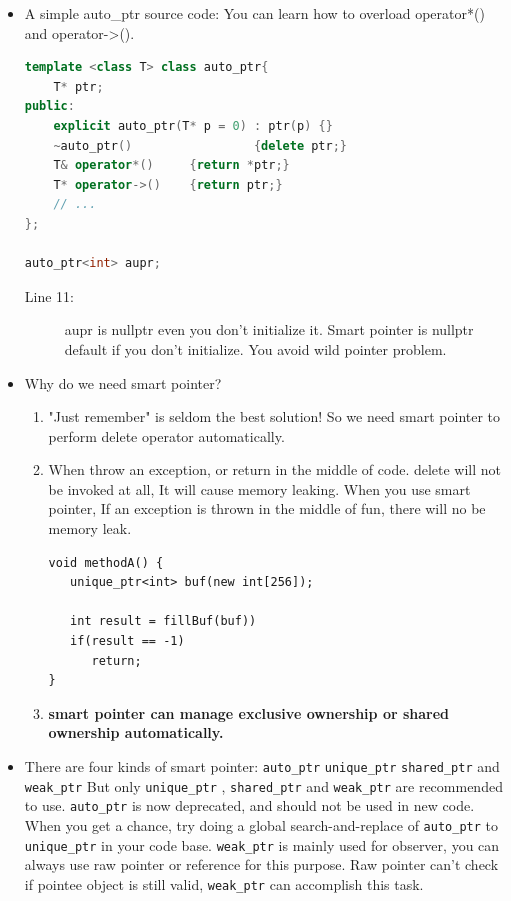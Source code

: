 \documentclass[a4paper,11pt,twoside]{book}
\begin{document}
\begin{itemize}
\item A simple auto\_ptr source code: You can learn how to overload operator*() and operator->().
\begin{lstlisting}[frame=single, language=c++, mathescape=true]
template <class T> class auto_ptr{
    T* ptr;
public:
    explicit auto_ptr(T* p = 0) : ptr(p) {}
    ~auto_ptr()                 {delete ptr;}
    T& operator*()     {return *ptr;}
    T* operator->()    {return ptr;}
    // ...
};

auto_ptr<int> aupr;

\end{lstlisting}
\begin{description}
	\item[Line 11:] aupr is nullptr even you don't initialize it. Smart pointer is nullptr default if you don't initialize. You avoid wild pointer problem.
\end{description}

\item Why do we need smart pointer?
\begin{enumerate}
\item "Just remember" is seldom the best solution! So we need smart pointer to perform delete operator automatically.

\item When throw an exception, or return in the middle of code. delete will not be invoked at all, It will cause memory leaking. When you use smart pointer, If an exception is thrown in the middle of fun, there will no be memory leak.
\begin{lstlisting}[numbers=none]
void methodA() {
   unique_ptr<int> buf(new int[256]);

   int result = fillBuf(buf))
   if(result == -1)
      return;
}
\end{lstlisting}

\item \textbf{smart pointer can manage exclusive ownership or shared ownership automatically. }
\end{enumerate}

\item There are four kinds of smart pointer: \texttt{auto\_ptr} \texttt{unique\_ptr} \texttt{shared\_ptr} and \texttt{weak\_ptr}  But only \texttt{unique\_ptr} , \texttt{shared\_ptr} and \texttt{weak\_ptr} are recommended to use. \texttt{auto\_ptr} is now deprecated, and should not be used in new code. When you get a chance, try doing a global search-and-replace of \texttt{auto\_ptr} to \texttt{unique\_ptr} in your code base. \texttt{weak\_ptr} is mainly used for observer, you can always use raw pointer or reference for this purpose. Raw pointer can't check if pointee object is still valid, \texttt{weak\_ptr} can accomplish this task.


\end{itemize}
\end{document}
